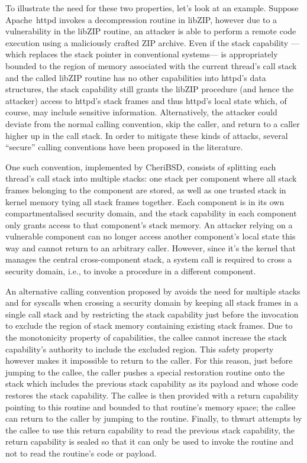 \documentclass[main.tex]{subfiles}
\begin{document}
To illustrate the need for these two properties, let’s look at an example. Suppose Apache httpd invokes a decompression routine in libZIP, however due to a vulnerability in the libZIP routine, an attacker is able to perform a remote code execution using a maliciously crafted ZIP archive. Even if the stack capability —which replaces the stack pointer in conventional systems— is appropriately bounded to the region of memory associated with the current thread’s call stack and the called libZIP routine has no other capabilities into httpd’s data structures, the stack capability still grants the libZIP procedure (and hence the attacker) access to httpd’s stack frames and thus httpd’s local state which, of course, may include sensitive information. Alternatively, the attacker could deviate from the normal calling convention, skip the caller, and return to a caller higher up in the call stack. In order to mitigate these kinds of attacks, several “secure” calling conventions have been proposed in the literature.

One such convention, implemented by CheriBSD, consists of splitting each thread’s call stack into multiple stacks: one stack per component where all stack frames belonging to the component are stored, as well as one trusted stack in kernel memory tying all stack frames together. Each component is in its own compartmentalised security domain, and the stack capability in each component only grants access to that component’s stack memory. An attacker relying on a vulnerable component can no longer access another component’s local state this way and cannot return to an arbitrary caller. However, since it’s the kernel that manages the central cross-component stack, a system call is required to cross a security domain, i.e., to invoke a procedure in a different component.

An alternative calling convention proposed by \cite{retptr} avoids the need for multiple stacks and for syscalls when crossing a security domain by keeping all stack frames in a single call stack and by restricting the stack capability just before the invocation to exclude the region of stack memory containing existing stack frames. Due to the monotonicity property of capabilities, the callee cannot increase the stack capability’s authority to include the excluded region. This safety property however makes it impossible to return to the caller. For this reason, just before jumping to the callee, the caller pushes a special restoration routine onto the stack which includes the previous stack capability as its payload and whose code restores the stack capability. The callee is then provided with a return capability pointing to this routine and bounded to that routine’s memory space; the callee can return to the caller by jumping to the routine. Finally, to thwart attempts by the callee to use this return capability to read the previous stack capability, the return capability is sealed so that it can only be used to invoke the routine and not to read the routine’s code or payload.
\end{document}
